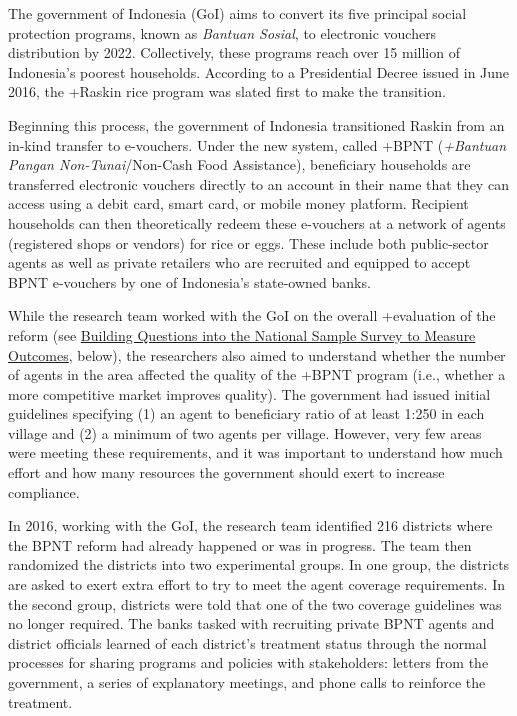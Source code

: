 \documentclass[
]{WileySix}
\begin{document}
The government of Indonesia (GoI) aims to convert its five principal social protection programs, known as \emph{Bantuan Sosial}, to electronic vouchers distribution by 2022. Collectively, these programs reach over 15 million of Indonesia's poorest households. According to a Presidential Decree issued in June 2016, the +Raskin\textbar{} rice program was slated first to make the transition.

Beginning this process, the government of Indonesia transitioned Raskin from an in-kind transfer to e-vouchers. Under the new system, called +BPNT\textbar{} (\emph{+Bantuan Pangan Non-Tunai}/Non-Cash Food Assistance), beneficiary households are transferred electronic vouchers directly to an account in their name that they can access using a debit card, smart card, or mobile money platform. Recipient households can then theoretically redeem these e-vouchers at a network of agents (registered shops or vendors) for rice or eggs. These include both public-sector agents as well as private retailers who are recruited and equipped to accept BPNT e-vouchers by one of Indonesia's state-owned banks.

While the research team worked with the GoI on the overall +evaluation\textbar{} of the reform (see \protect\hyperlink{building-questions-into-the-national-sample-survey-to-measure-outcomes}{Building Questions into the National Sample Survey to Measure Outcomes}, below), the researchers also aimed to understand whether the number of agents in the area affected the quality of the +BPNT\textbar{} program (i.e., whether a more competitive market improves quality). The government had issued initial guidelines specifying (1) an agent to beneficiary ratio of at least 1:250 in each village and (2) a minimum of two agents per village. However, very few areas were meeting these requirements, and it was important to understand how much effort and how many resources the government should exert to increase compliance.

In 2016, working with the GoI, the research team identified 216 districts where the BPNT reform had already happened or was in progress. The team then randomized the districts into two experimental groups. In one group, the districts are asked to exert extra effort to try to meet the agent coverage requirements. In the second group, districts were told that one of the two coverage guidelines was no longer required. The banks tasked with recruiting private BPNT agents and district officials learned of each district's treatment status through the normal processes for sharing programs and policies with stakeholders: letters from the government, a series of explanatory meetings, and phone calls to reinforce the treatment.
\end{document}
